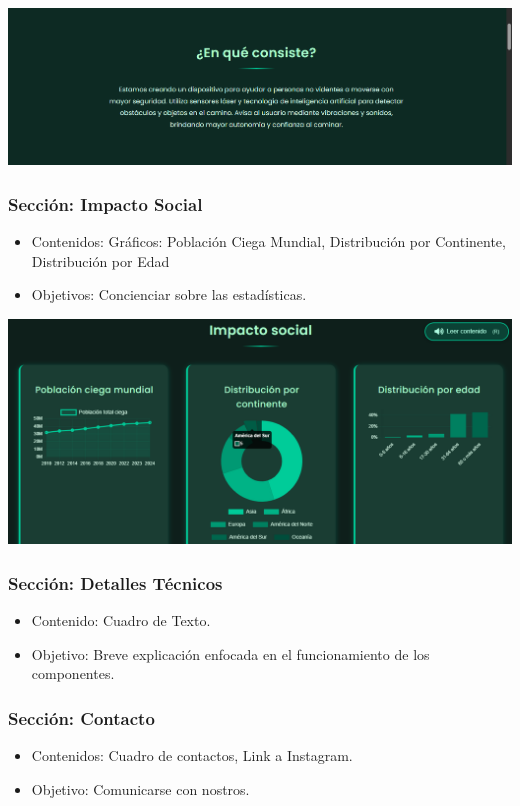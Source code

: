 \documentclass[12pt,a4paper]{article}
\begin{document}
\includegraphics[width=\linewidth]{Carpeta tecnica/cnste.png}

\subsubsection*{Sección: Impacto Social}
\begin{itemize}
    \item Contenidos: Gráficos: Población Ciega Mundial, Distribución por Continente, Distribución por Edad
    \item Objetivos: Concienciar sobre las estadísticas.
\end{itemize}

\includegraphics[width=\linewidth]{Carpeta tecnica/grfcs.png}

\subsubsection*{ Sección: Detalles Técnicos}
\begin{itemize}
    \item Contenido: Cuadro de Texto.
    \item Objetivo: Breve explicación enfocada en el funcionamiento de los componentes. 
\end{itemize}

\subsubsection*{Sección: Contacto }
\begin{itemize}
    \item Contenidos: Cuadro de contactos, Link a Instagram.
    \item Objetivo: Comunicarse con nostros.
\end{itemize}
\end{document}
